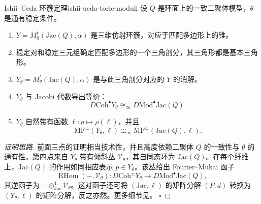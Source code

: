 \begin{theorem}{Ishii--Ueda 环簇定理}{ishii-ueda-toric-moduli}
设 $Q$ 是环面上的一致二聚体模型，$\theta$ 是通有稳定条件。
\begin{enumerate}[label=(\roman*)]
  \item $Y= M^t_0(\mathrm{Jac}(Q),\alpha)$ 是三维仿射环簇，对应于匹配多边形上的锥。
  \item 稳定对和稳定三元组确定匹配多边形的一个三角剖分，其三角形都是基本三角形。
  \item $Y_\theta=M^t_\theta(\mathrm{Jac}(Q),\alpha)$ 是与此三角剖分对应的 $Y$ 的消解。
  \item $Y_\theta$ 与 Jacobi 代数导出等价：
  \[
    D\mathrm{Coh}^{\bullet}Y_\theta\cong_\infty D\mathrm{Mod}^{\bullet}\mathrm{Jac}(Q).
  \]
  \item $Y_\theta$ 自然带有函数 $\ell\colon\rho\mapsto\rho(\ell)$，并且
  \[
    \mathrm{MF}^{\pm}(Y_\theta,\ell)
    \cong_\infty\mathrm{MF}^{\pm}(\mathrm{Jac}(Q),\ell).
  \]
\end{enumerate}
\end{theorem}
\begin{proof}[证明思路]
前面三点的证明相当技术性，并且高度依赖二聚体 $Q$ 的一致性与 $\theta$ 的通有性。第四点来自 $Y_\theta$ 带有倾斜丛 $\mathcal V_\theta$，其自同态环为 $\mathrm{Jac}(Q)$。在每个纤维上，$\mathrm{Jac}(Q)$ 的作用如同相应表示 $p\in Y_\theta$。该丛给出 Fourier--Mukai 函子
\[
  \operatorname{RHom}(-,\mathcal V_\theta)\colon
  D\mathrm{Coh}^{\pm}Y_\theta\longrightarrow D\mathrm{Mod}^{\bullet}\mathrm{Jac}(Q),
\]
其逆函子为 $-\otimes_{\mathrm{Jac}}^{\mathbf L}\mathcal V_\theta$。这对函子还可将 $(\mathrm{Jac},\ell)$ 的矩阵分解 $(P,d)$ 转换为 $(Y_\theta,\ell)$ 的矩阵分解，反之亦然。更多细节见。
\hfill$\square$
\end{proof}

